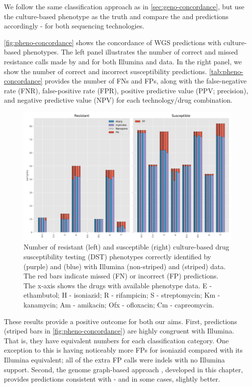 We follow the same classification approach as in \autoref{sec:geno-concordance}, but use the culture-based phenotype as the truth and compare the \mykrobe{} and \drprg{} predictions accordingly - for both sequencing technologies.

\autoref{fig:pheno-concordance} shows the concordance of WGS predictions with culture-based phenotypes. The left panel illustrates the number of correct and missed resistance calls made by \mykrobe{} and \drprg{} for both Illumina and \ont{} data. In the right panel, we show the number of correct and incorrect susceptibility predictions. \autoref{tab:pheno-concordance} provides the number of FNs and FPs, along with the false-negative rate (FNR), false-positive rate (FPR), positive predictive value (PPV; precision), and negative predictive value (NPV) for each technology/drug combination. 

\begin{figure}
\begin{center}
\includegraphics[width=0.90\columnwidth]{Chapter3/Figs/pheno_concordance_plot.png}
\caption{{Number of resistant (left) and susceptible (right) culture-based drug susceptibility testing (DST) phenotypes correctly identified by \mykrobe{} (purple) and \drprg{} (blue) with Illumina (non-striped) and \ont{} (striped) data. The red bars indicate missed (FN) or incorrect (FP) predictions. The x-axis shows the drugs with available phenotype data. E - ethambutol; H - isoniazid; R - rifampicin; S - streptomycin; Km - kanamycin; Am - amikacin; Ofx - ofloxacin; Cm - capreomycin.
{\label{fig:pheno-concordance}}
}}
\end{center}
\end{figure}

These results provide a positive outcome for both our aims. First, \ont{} predictions (striped bars in \autoref{fig:pheno-concordance}) are highly congruent with Illumina. That is, they have equivalent numbers for each classification category. One exception to this is \mykrobe{} \ont{} having noticeably more FPs for isoniazid compared with its Illumina equivalent; all of the extra \ont{} FP calls were indels with no Illumina support. Second, the genome graph-based approach \drprg{}, developed in this chapter, provides predictions consistent with \mykrobe{} - and in some cases, slightly better. 

